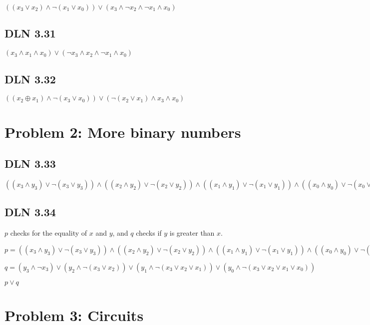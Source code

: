 \documentclass[titlepage]{article}
\begin{document}
\(((x_3\lor x_2)\land \lnot(x_1\lor x_0)) \lor (x_3 \land \lnot x_2 \land \lnot x_1 \land x_0)\)

\subsection{DLN 3.31} 

\((x_3 \land x_1 \land x_0) \lor (\lnot x_3 \land x_2 \land \lnot x_1 \land x_0)\)

\subsection{DLN 3.32} 

\(((x_2 \oplus x_1) \land \lnot(x_3 \lor x_0)) \lor  (\lnot(x_2 \lor x_1) \land x_3 \land x_0)\)


\section{Problem 2: More binary numbers}

\subsection{DLN 3.33} 

\( ((x_3 \land y_3) \lor \lnot(x_3 \lor y_3)) \land ((x_2 \land y_2) \lor \lnot(x_2 \lor y_2)) \land ((x_1 \land y_1) \lor \lnot(x_1\lor y_1)) \land ((x_0 \land y_0) \lor \lnot(x_0 \lor y_0))    \)

\subsection{DLN 3.34} 

$p$ checks for the equality of $x$ and $y$, and $q$ checks if $y$ is greater than $x$.

\( p = ((x_3 \land y_3) \lor \lnot(x_3 \lor y_3)) \land ((x_2 \land y_2) \lor \lnot(x_2 \lor y_2)) \land ((x_1 \land y_1) \lor \lnot(x_1\lor y_1)) \land ((x_0 \land y_0) \lor \lnot(x_0 \lor y_0))    \)

\( q = (y_3 \land \lnot x_3) \lor (y_2 \land \lnot(x_3 \lor x_2)) \lor (y_1 \land \lnot(x_3 \lor x_2 \lor x_1)) \lor (y_0 \land \lnot(x_3 \lor x_2 \lor x_1 \lor x_0))    \)

\( p \lor q \)

\section{Problem 3: Circuits}
\end{document}
